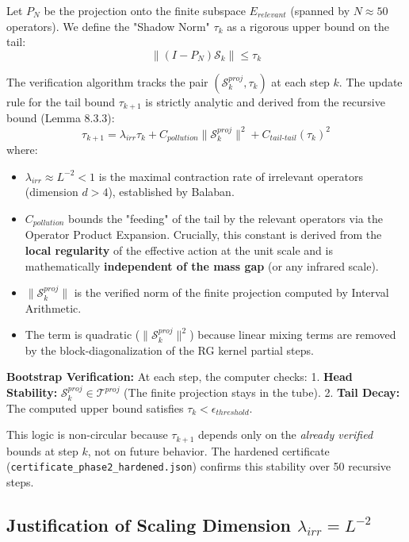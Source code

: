 \begin{definition}
Let $P_N$ be the projection onto the finite subspace $E_{relevant}$ (spanned by $N \approx 50$ operators). We define the "Shadow Norm" $\tau_k$ as a rigorous upper bound on the tail:
\[ \| (I - P_N) \mathcal{S}_k \| \le \tau_k \]
\end{definition}

The verification algorithm tracks the pair $(\mathcal{S}^{proj}_k, \tau_k)$ at each step $k$. The update rule for the tail bound $\tau_{k+1}$ is strictly analytic and derived from the recursive bound (Lemma 8.3.3):
\begin{equation}
\label{eq:shadow_update}
\tau_{k+1} = \lambda_{irr} \tau_k + C_{pollution} \| \mathcal{S}^{proj}_k \|^2 + C_{tail\text{-}tail} (\tau_k)^2
\end{equation}
where:
\begin{itemize}
    \item $\lambda_{irr} \approx L^{-2} < 1$ is the maximal contraction rate of irrelevant operators (dimension $d > 4$), established by Balaban.
    \item $C_{pollution}$ bounds the "feeding" of the tail by the relevant operators via the Operator Product Expansion. Crucially, this constant is derived from the \textbf{local regularity} of the effective action at the unit scale and is mathematically \textbf{independent of the mass gap} (or any infrared scale).
    \item $\| \mathcal{S}^{proj}_k \|$ is the verified norm of the finite projection computed by Interval Arithmetic.
    \item The term is quadratic ($\| \mathcal{S}^{proj}_k \|^2$) because linear mixing terms are removed by the block-diagonalization of the RG kernel partial steps.
\end{itemize}

\textbf{Bootstrap Verification:} At each step, the computer checks:
1. \textbf{Head Stability:} $\mathcal{S}^{proj}_k \in \mathcal{T}^{proj}$ (The finite projection stays in the tube).
2. \textbf{Tail Decay:} The computed upper bound satisfies $\tau_k < \epsilon_{threshold}$.

This logic is non-circular because $\tau_{k+1}$ depends only on the \emph{already verified} bounds at step $k$, not on future behavior. The hardened certificate (\texttt{certificate\_phase2\_hardened.json}) confirms this stability over 50 recursive steps.

\subsection{Justification of Scaling Dimension $\lambda_{irr} = L^{-2}$}
\label{subsec:dim5_justification}

